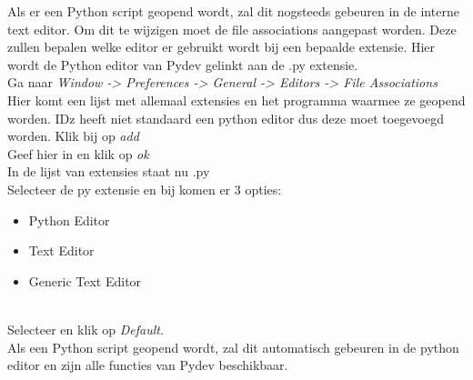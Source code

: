 Als er een Python script geopend wordt, zal dit nogsteeds gebeuren in de interne text editor. Om dit te wijzigen moet de file associations aangepast worden. Deze zullen bepalen welke editor er gebruikt wordt bij een bepaalde extensie. Hier wordt de Python editor van Pydev gelinkt aan de .py extensie. \\

Ga naar \textit{Window -> Preferences -> General -> Editors -> File Associations} \\

Hier komt een lijst met allemaal extensies en het programma waarmee ze geopend worden. IDz heeft niet standaard een python editor dus deze moet toegevoegd worden. Klik bij  op \textit{add} \\

Geef hier  in en klik op \textit{ok} \\

In de lijst van extensies staat nu .py \\

Selecteer de py extensie en bij  komen er 3 opties:
\begin{itemize}
    \item Python Editor
    \item Text Editor
    \item Generic Text Editor
\end{itemize}
\\
Selecteer  en klik op \textit{Default}. \\


Als een Python script geopend wordt, zal dit automatisch gebeuren in de python editor en zijn alle functies van Pydev beschikbaar.




